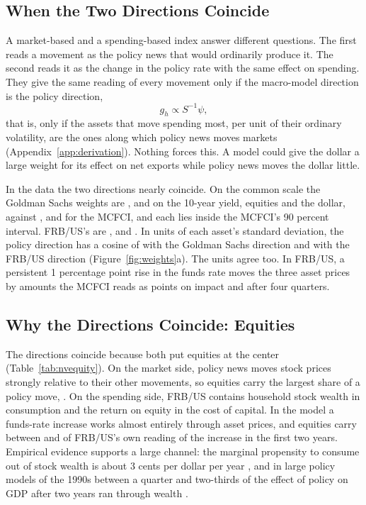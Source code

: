 \documentclass[11pt]{article}
\begin{document}
\subsection{When the Two Directions Coincide}\label{sec:agree}
A market-based and a spending-based index answer different questions. The first reads a movement as the policy news that would ordinarily produce it. The second reads it as the change in the policy rate with the same effect on spending. They give the same reading of every movement only if the macro-model direction is the policy direction,
\begin{equation}\label{eq:agree}
g_h\propto S^{-1}\psi ,
\end{equation}
that is, only if the assets that move spending most, per unit of their ordinary volatility, are the ones along which policy news moves markets (Appendix~\ref{app:derivation}). Nothing forces this. A model could give the dollar a large weight for its effect on net exports while policy news moves the dollar little.

In the data the two directions nearly coincide. On the common scale the Goldman Sachs weights are ,  and  on the 10-year yield, equities and the dollar, against ,  and  for the MCFCI, and each lies inside the MCFCI's 90 percent interval. FRB/US's are ,  and . In units of each asset's standard deviation, the policy direction has a cosine of  with the Goldman Sachs direction and  with the FRB/US direction (Figure~\ref{fig:weights}a). The units agree too. In FRB/US, a persistent 1 percentage point rise in the funds rate moves the three asset prices by amounts the MCFCI reads as  points on impact and  after four quarters.

\subsection{Why the Directions Coincide: Equities}\label{sec:equities}
The directions coincide because both put equities at the center (Table~\ref{tab:nvequity}). On the market side, policy news moves stock prices strongly relative to their other movements, so equities carry the largest share of a policy move, . On the spending side, FRB/US contains household stock wealth in consumption and the return on equity in the cost of capital. In the model a funds-rate increase works almost entirely through asset prices, and equities carry between  and  of FRB/US's own reading of the increase in the first two years. Empirical evidence supports a large channel: the marginal propensity to consume out of stock wealth is about 3 cents per dollar per year \citep{chodorowreich2021}, and in large policy models of the 1990s between a quarter and two-thirds of the effect of policy on GDP after two years ran through wealth \citep{ludvigson2002}.
\end{document}
